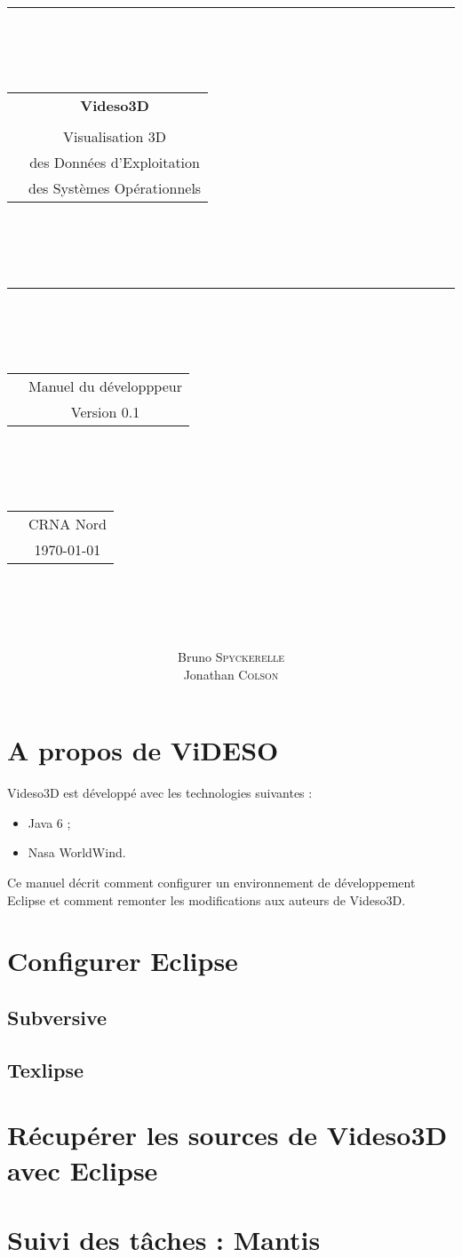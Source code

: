 \documentclass[a4paper, titlepage]{article}
\title{
\vspace{1cm} 
\rule{\textwidth}{1mm}
\vspace{1mm}\\
\begin{tabular}{p{0cm} c}
   & {\Huge {\bf Videso3D}} \\
   & \\
   & {\huge Visualisation 3D} \\
   & {\huge des Données d'Exploitation} \\
   & {\huge des Systèmes Opérationnels}
 \end{tabular}\\
\rule{\textwidth}{1mm}
\vspace{2cm}\\
\begin{tabular}{p{0cm} c}
	&{\huge Manuel du développpeur}\\
   &{\large Version 0.1}
 \end{tabular}
\vspace{2cm}\\
 \begin{tabular}{p{0cm} c}
    & {\large CRNA Nord} \\
    & {\large  \today}
 \end{tabular}\\
\vspace{1cm}
}
\author{
Bruno \textsc{Spyckerelle}\\
Jonathan \textsc{Colson}}
\date{}
\begin{document}
\maketitle
\tableofcontents
\newpage

\section{A propos de ViDESO}
Videso3D est développé avec les technologies suivantes :
\begin{itemize}
 \item Java 6 ;
 \item Nasa WorldWind.
\end{itemize}
\par


Ce manuel décrit comment configurer un environnement de développement Eclipse
et comment remonter les modifications aux auteurs de Videso3D.


\section{Configurer Eclipse}
\subsection{Subversive}
\subsection{Texlipse}

\section{Récupérer les sources de Videso3D avec Eclipse}

\section{Suivi des tâches : Mantis}
\end{document}

